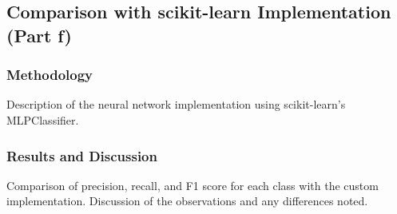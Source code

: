 \documentclass[12pt]{article}
\begin{document}
\subsection{Comparison with scikit-learn Implementation (Part f)}
\subsubsection{Methodology}
Description of the neural network implementation using scikit-learn's MLPClassifier.

\subsubsection{Results and Discussion}
Comparison of precision, recall, and F1 score for each class with the custom implementation. Discussion of the observations and any differences noted.
\end{document}
